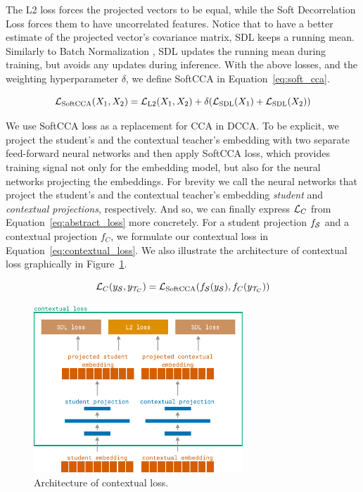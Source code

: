 The L2 loss forces the projected vectors to be equal, while the Soft
Decorrelation Loss forces them to have uncorrelated features. Notice that to
have a better estimate of the projected vector's covariance matrix, SDL keeps a
running mean. Similarly to Batch Normalization \citep{ioffe2015batch}, SDL
updates the running mean during training, but avoids any updates during
inference. With the above losses, and the weighting hyperparameter
$\delta$, we define SoftCCA in Equation~\ref{eq:soft_cca}.

\begin{equation}\label{eq:soft_cca}
  \mathcal{L}_{\text{SoftCCA}}(X_1, X_2) = \mathcal{L}_{\text{L2}}(X_1, X_2) +
      \delta ( \mathcal{L}_{\text{SDL}}(X_1) + \mathcal{L}_{\text{SDL}}(X_2) )
\end{equation}

We use SoftCCA loss as a replacement for CCA in DCCA. To be explicit, we
project the student's and the contextual teacher's embedding with two separate
feed-forward neural networks and then apply SoftCCA loss, which provides
training signal not only for the embedding model, but also for the neural
networks projecting the embeddings. For brevity we call the neural networks
that project the student's and the contextual teacher's embedding
\emph{student} and \emph{contextual projections}, respectively. And so, we can
finally express $\mathcal{L}_C$ from Equation~\ref{eq:abstract_loss} more concretely.
For a student projection $f_{\mathcal{S}}$ and a contextual projection $f_C$, we
formulate our contextual loss in Equation~\ref{eq:contextual_loss}. We also
illustrate the architecture of contextual loss graphically in
Figure~\ref{fig:contextual_loss}.

\begin{equation}\label{eq:contextual_loss}
  \mathcal{L}_C(y_{\mathcal{S}}, y_{\mathcal{T}_C}) = \mathcal{L}_{\text{SoftCCA}}(
    f_{\mathcal{S}}(y_{\mathcal{S}}),
    f_C(y_{\mathcal{T}_C})
  )
\end{equation}

\begin{figure}

  \centering
  \includegraphics[width=0.7\textwidth]{img/contextual_loss.pdf}

  \caption{Architecture of contextual loss.}

  \label{fig:contextual_loss}

\end{figure}


